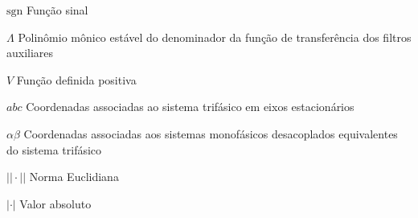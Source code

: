 \documentclass[12pt,
              openright,
              twoside,
              a4paper,
              english,
              french,
              spanish,
              sumario=tradicional,
              brazil
              ]{abntex2}
\begin{document}
\begin{simbolos}
 \item[$ \mathrm{sgn} $] Função sinal
 \item[$ \Lambda $] Polinômio mônico estável do denominador da função de transferência dos filtros auxiliares
 \item[$ V $] Função definida positiva
 \item[$ abc $] Coordenadas associadas ao sistema trifásico em eixos estacionários
 \item[$ \alpha \beta $] Coordenadas associadas aos sistemas monofásicos desacoplados equivalentes do sistema trifásico
 \item[$ ||\cdot|| $] Norma Euclidiana
 \item[$ |\cdot| $] Valor absoluto
\end{simbolos}

\tableofcontents*
\cleardoublepage



\textual







%

\end{document}
